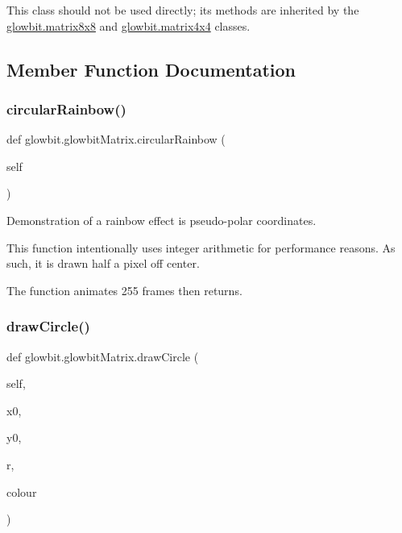This class should not be used directly; its methods are inherited by the \hyperlink{classglowbit_1_1matrix8x8}{glowbit.\+matrix8x8} and \hyperlink{classglowbit_1_1matrix4x4}{glowbit.\+matrix4x4} classes. 

\subsection{Member Function Documentation}
\mbox{\label{classglowbit_1_1glowbitMatrix_adf29bdb4294bcf27ae560130b0fcae35}} 
\subsubsection{\texorpdfstring{circular\+Rainbow()}{circularRainbow()}}
{\footnotesize\ttfamily def glowbit.\+glowbit\+Matrix.\+circular\+Rainbow (\begin{DoxyParamCaption}\item[{}]{self }\end{DoxyParamCaption})}



Demonstration of a rainbow effect is pseudo-\/polar coordinates. 

This function intentionally uses integer arithmetic for performance reasons. As such, it is drawn half a pixel off center.

The function animates 255 frames then returns. \mbox{\label{classglowbit_1_1glowbitMatrix_a4efec5ce17c30403505b1f2775022e90}} 
\subsubsection{\texorpdfstring{draw\+Circle()}{drawCircle()}}
{\footnotesize\ttfamily def glowbit.\+glowbit\+Matrix.\+draw\+Circle (\begin{DoxyParamCaption}\item[{}]{self,  }\item[{}]{x0,  }\item[{}]{y0,  }\item[{}]{r,  }\item[{}]{colour }\end{DoxyParamCaption})}



